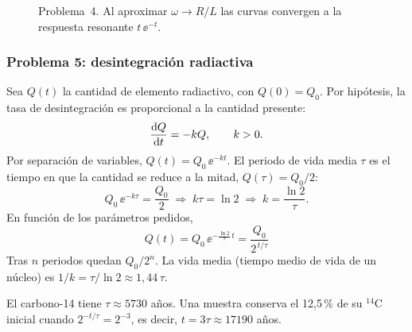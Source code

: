 \begin{figure}[H]
  \centering
  \caption{Problema~4. Al aproximar $\omega\to R/L$ las curvas convergen a la respuesta resonante $t\,\ee^{-t}$.}
  \label{fig:p4}
\end{figure}

\subsubsection*{Problema 5: desintegración radiactiva}

\begin{solucion}
Sea $Q(t)$ la cantidad de elemento radiactivo, con $Q(0)=Q_0$. Por hipótesis, la tasa de desintegración es proporcional a la cantidad presente:
\[
  \dfrac{\mathrm{d} Q}{\mathrm{d} t}=-kQ,\qquad k>0 .
\]
Por separación de variables, $Q(t)=Q_0\,\ee^{-kt}$. El periodo de vida media $\tau$ es el tiempo en que la cantidad se reduce a la mitad, $Q(\tau)=Q_0/2$:
\[
  Q_0\,\ee^{-k\tau}=\frac{Q_0}{2}\;\Longrightarrow\;k\tau=\ln2\;\Longrightarrow\;k=\frac{\ln2}{\tau}.
\]
En función de los parámetros pedidos,
\begin{equation}
  \boxed{\,Q(t)=Q_0\,\ee^{-\frac{\ln2}{\tau}\,t}=\frac{Q_0}{2^{\,t/\tau}}\,}
  \label{eq:p5}
\end{equation}
Tras $n$ periodos quedan $Q_0/2^n$. La vida media (tiempo medio de vida de un núcleo) es $1/k=\tau/\ln2\approx1{,}44\,\tau$.
\end{solucion}

\begin{example}
El carbono-14 tiene $\tau\approx\num{5730}$ años. Una muestra conserva el 12,5\,\% de su $^{14}$C inicial cuando $2^{-t/\tau}=2^{-3}$, es decir, $t=3\tau\approx\num{17190}$ años.\finejemplo
\end{example}

